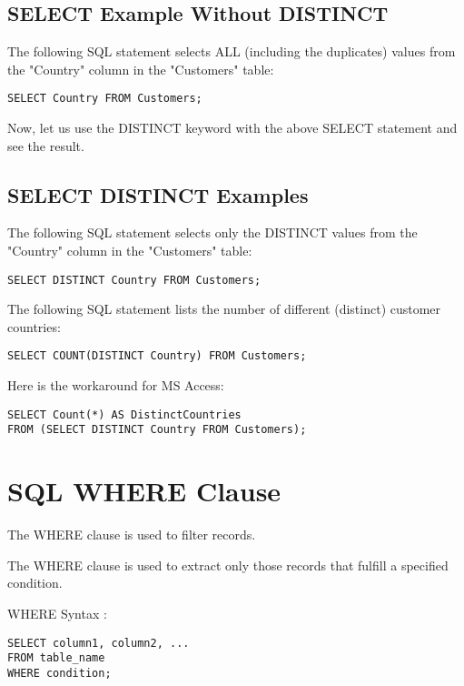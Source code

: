 \documentclass[a4paper,12pt]{article}
\begin{document}
\subsection{SELECT Example Without DISTINCT}

The following SQL statement selects ALL (including the duplicates) values from the "Country" column in the "Customers" table:


\begin{lstlisting}
SELECT Country FROM Customers;
\end{lstlisting}


Now, let us use the DISTINCT keyword with the above SELECT statement and see the result.



\subsection{SELECT DISTINCT Examples}

The following SQL statement selects only the DISTINCT values from the "Country" column in the "Customers" table:

\begin{lstlisting}
SELECT DISTINCT Country FROM Customers;
\end{lstlisting}


The following SQL statement lists the number of different (distinct) customer countries:

\begin{lstlisting}
SELECT COUNT(DISTINCT Country) FROM Customers;
\end{lstlisting}


Here is the workaround for MS Access:

\begin{lstlisting}
SELECT Count(*) AS DistinctCountries
FROM (SELECT DISTINCT Country FROM Customers);
\end{lstlisting}



\section{SQL WHERE Clause}

The WHERE clause is used to filter records.

The WHERE clause is used to extract only those records that fulfill a specified condition.

WHERE Syntax :


\begin{lstlisting}
SELECT column1, column2, ...
FROM table_name
WHERE condition;
\end{lstlisting}
\end{document}
